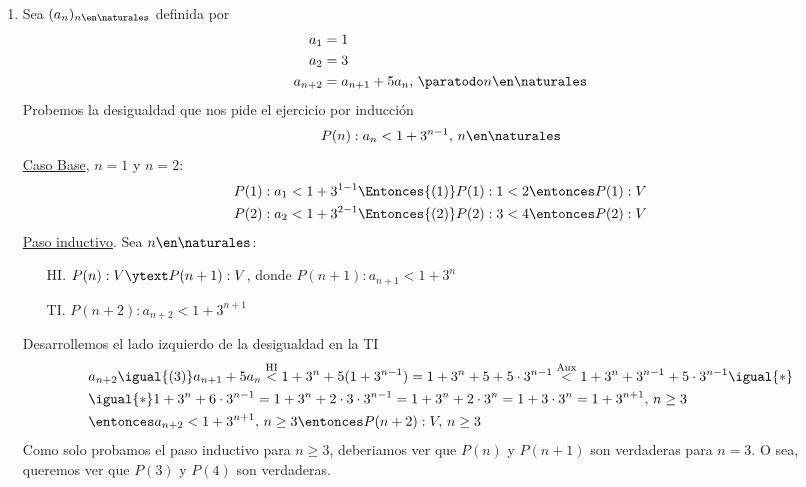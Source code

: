 \begin{enumerate}[label=\roman*)]
  \item Sea $(a_n)_{n \en \naturales }$ definida por
        \setcounter{equation}{0}
        \begin{align}
          a_1     & = 1                                            \\
          a_2     & = 3                                            \\
          a_{n+2} & = a_{n+1} + 5a_n,\, \paratodo n \en \naturales
        \end{align}
        Probemos la desigualdad que nos pide el ejercicio por inducción
        \begin{align*}
          P(n): a_n < 1 + 3^{n-1},\, n \en \naturales
        \end{align*}
        \underline{Caso Base}, $n = 1$ y $n = 2$:
        \begin{align*}
           & P(1): a_1 < 1 + 3^{1-1} \Entonces{(1)} P(1): 1 < 2 \entonces P(1):V \\
           & P(2): a_2 < 1 + 3^{2-1} \Entonces{(2)} P(2): 3 < 4 \entonces P(2):V
        \end{align*}
        \underline{Paso inductivo}. Sea $n \en \naturales $:
        \begin{enumerate}
          \item[HI.] $P(n):V \ytext P(n+1):V$, donde $P(n+1): a_{n+1} < 1 + 3^n$
          \item[TI.] $P(n+2): a_{n+2} < 1 + 3^{n+1}$
        \end{enumerate}
        Desarrollemos el lado izquierdo de la desigualdad en la TI
        \begin{align*}
           & a_{n+2} \igual{(3)} a_{n+1} + 5a_n \overset{\text{HI}}{<} 1 + 3^n + 5(1 + 3^{n-1}) =
          1 + 3^n + 5 + 5 \cdot 3^{n-1} \overset{\text{Aux}}{<} 1 + 3^n + 3^{n-1} + 5 \cdot 3^{n-1} \igual{*} \\
           & \igual{*} 1 + 3^n + 6 \cdot 3^{n-1} = 1 + 3^n + 2 \cdot 3 \cdot 3^{n-1}
          = 1 + 3^n + 2 \cdot 3^n = 1 + 3 \cdot 3^n = 1 + 3^{n+1},\, n \geq 3                                 \\
           & \entonces a_{n+2} < 1 + 3^{n+1},\, n \geq 3 \entonces P(n+2):V,\, n \geq 3
        \end{align*}
        Como solo probamos el paso inductivo para $n \geq 3$, deberiamos ver que $P(n)$ y $P(n+1)$ son verdaderas para $n = 3$. O sea,
        queremos ver que $P(3)$ y $P(4)$ son verdaderas.

\end{enumerate}
